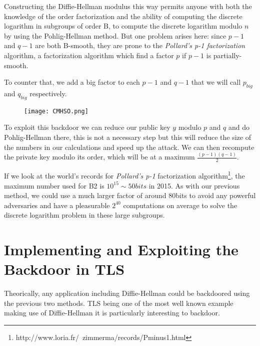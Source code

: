 \documentclass[a4paper,11pt,twocolumn]{article}
\begin{document}
Constructing the Diffie-Hellman modulus this way permits anyone with both the knowledge of the order factorization and the ability of computing the discrete logarithm in subgroups of order B, to compute the discrete logarithm modulo $n$ by using the Pohlig-Hellman method. But one problem arises here: since $p-1$ and $q-1$ are both B-smooth, they are prone to the \emph{Pollard's p-1 factorization} algorithm, a factorization algorithm which find a factor $p$ if $p-1$ is partially-smooth.

To counter that, we add a big factor to each $p-1$ and $q-1$ that we will call $p_{big}$ and $q_{big}$ respectively. 

\begin{figure}[H]
\centering
\texttt{[image: CMHSO.png]}
\end{figure}

To exploit this backdoor we can reduce our public key $y$ modulo $p$ and $q$ and do Pohlig-Hellman there, this is not a necessary step but this will reduce the size of the numbers in our calculations and speed up the attack. We can then recompute the private key modulo its order, which will be at a maximum $\frac{(p-1)(q-1)}{2}$.

If we look at the world's records for \emph{Pollard's p-1} factorization algorithm\footnote{http://www.loria.fr/~zimmerma/records/Pminus1.html}, the maximum number used for B2 is $10^{15} \sim 50bits$ in 2015. As with our previous method, we could use a much larger factor of around 80bits to avoid any powerful adversaries and have a pleasurable $2^{40}$ computations on average to solve the discrete logarithm problem in these large subgroups.


\section{Implementing and Exploiting the Backdoor in TLS}


Theorically, any application including Diffie-Hellman could be backdoored using the previous two methods. TLS being one of the most well known example making use of Diffie-Hellman it is particularly interesting to backdoor.
\end{document}
